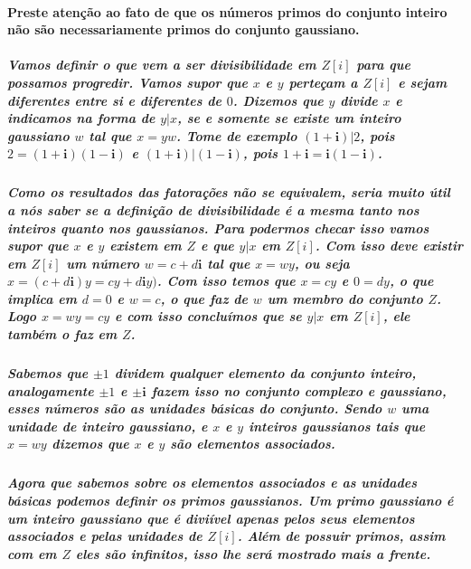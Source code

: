 \paragraph{
Preste aten\c{c}\~ao ao fato de que os n\'umeros primos do conjunto inteiro n\~ao s\~ao necessariamente primos do conjunto gaussiano.}
\subparagraph{
Vamos definir o que vem a ser divisibilidade em $Z[i]$ para que possamos progredir. Vamos supor que $x$ e $y$ perte\c{c}am a $Z[i]$ e sejam diferentes entre si e diferentes de $0$. Dizemos que $y$ divide $x$ e indicamos na forma de $y|x$, se e somente se existe um inteiro gaussiano $w$ tal que $x=yw$. Tome de exemplo $(1 + \textbf{i})|2$, pois $ 2 = (1 + \textbf{i})(1 - \textbf{i})$ e $(1 + \textbf{i})|(1 - \textbf{i})$, pois $ 1 + \textbf{i} = \textbf{i}(1 - \textbf{i})$.
}
\subparagraph{
Como os resultados das fatora\c{c}\~oes n\~ao se equivalem, seria muito \'util a n\'os saber se a defini\c{c}\~ao de divisibilidade \'e a mesma tanto nos inteiros quanto nos gaussianos. Para podermos checar isso vamos supor que $x$ e $y$ existem em $Z$ e que $y|x$ em $Z[i]$. Com isso deve existir em $Z[i]$ um n\'umero $w = c + d\textbf{i}$ tal que $x=wy$, ou seja $x=(c + d\textbf{i})y = cy + d\textbf{i}y)$. Com isso temos que $x=cy$ e $0 = dy$, o que implica em $d = 0$ e $w=c$, o que faz de $w$ um membro do conjunto $Z$. Logo $x=wy=cy$ e com isso conclu\'imos que se $y|x$ em $Z[i]$, ele tamb\'em o faz em $Z$.
}
\subparagraph{
Sabemos que $\pm 1$ dividem qualquer elemento da conjunto inteiro, analogamente $\pm 1$ e $\pm \textbf{i}$ fazem isso no conjunto complexo e gaussiano, esses n\'umeros s\~ao as unidades b\'asicas do conjunto. Sendo $w$ uma unidade de inteiro gaussiano, e $x$ e $y$ inteiros gaussianos tais que $x = wy$ dizemos que $x$ e $y$ s\~ao elementos associados.
}
\subparagraph{
Agora que sabemos sobre os elementos associados e as unidades b\'asicas podemos definir os primos gaussianos. Um \textit{primo gaussiano} \'e um inteiro gaussiano que \'e divi\'ivel apenas pelos seus elementos associados e pelas unidades de $Z[i]$. Al\'em de possuir primos, assim com em $Z$ eles s\~ao infinitos, isso lhe ser\'a mostrado mais a frente.
}
